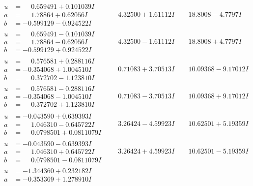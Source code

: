 \documentclass[1p]{elsarticle_modified}
\theoremstyle{definition}
\begin{document}
$$\begin{array}{c|c|c}
\begin{aligned}
u &= \phantom{-}0.659491 + 0.101039 I \\
a &= \phantom{-}1.78864 + 0.62056 I \\
b &= -0.599129 - 0.924522 I\end{aligned}
 & \phantom{-}4.32500 + 1.61112 I & \phantom{-}18.8008 - 4.7797 I \\ \hline\begin{aligned}
u &= \phantom{-}0.659491 - 0.101039 I \\
a &= \phantom{-}1.78864 - 0.62056 I \\
b &= -0.599129 + 0.924522 I\end{aligned}
 & \phantom{-}4.32500 - 1.61112 I & \phantom{-}18.8008 + 4.7797 I \\ \hline\begin{aligned}
u &= \phantom{-}0.576581 + 0.288116 I \\
a &= -0.354068 + 1.004510 I \\
b &= \phantom{-}0.372702 - 1.123810 I\end{aligned}
 & \phantom{-}0.71083 + 3.70513 I & \phantom{-}10.09368 - 9.17012 I \\ \hline\begin{aligned}
u &= \phantom{-}0.576581 - 0.288116 I \\
a &= -0.354068 - 1.004510 I \\
b &= \phantom{-}0.372702 + 1.123810 I\end{aligned}
 & \phantom{-}0.71083 - 3.70513 I & \phantom{-}10.09368 + 9.17012 I \\ \hline\begin{aligned}
u &= -0.043590 + 0.639393 I \\
a &= \phantom{-}1.046310 - 0.645722 I \\
b &= \phantom{-}0.0798501 + 0.0811079 I\end{aligned}
 & \phantom{-}3.26424 - 4.59923 I & \phantom{-}10.62501 + 5.19359 I \\ \hline\begin{aligned}
u &= -0.043590 - 0.639393 I \\
a &= \phantom{-}1.046310 + 0.645722 I \\
b &= \phantom{-}0.0798501 - 0.0811079 I\end{aligned}
 & \phantom{-}3.26424 + 4.59923 I & \phantom{-}10.62501 - 5.19359 I \\ \hline\begin{aligned}
u &= -1.344360 + 0.232182 I \\
a &= -0.353369 + 1.278910 I \\

\end{aligned}
\end{array}$$
\end{document}
